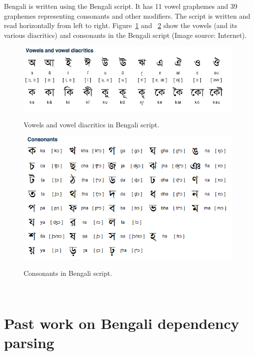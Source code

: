 \documentclass[11pt,letterpaper]{article}
\begin{document}
\noindent Bengali is written using the Bengali script. It has 11 vowel graphemes and 39 graphemes representing consonants and other modifiers. The script is written and read horizontally from left to right. Figure~\ref{vowels} and ~\ref{cons} show the vowels (and its  various diacritics) and consonants in the Bengali script (Image source: Internet).
\graphicspath{ {images/} }
\begin{figure}[h]
  \caption{Vowels and vowel diacritics in Bengali script.}
  \centering
  \includegraphics[scale=0.35]{vowels}
  \label{vowels}
\end{figure}
\begin{figure}[h]
  \caption{Consonants in Bengali script.}
  \centering
  \includegraphics[scale=0.35]{consonants}
  \label{cons}
\end{figure} \\

\section{Past work on Bengali dependency parsing}
\end{document}
